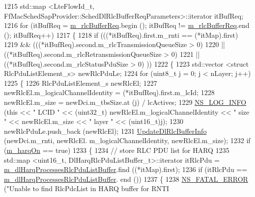 \begin{DoxyCode}
1215       std::map <LteFlowId\_t, FfMacSchedSapProvider::SchedDlRlcBufferReqParameters>::iterator itBufReq;
1216       \textcolor{keywordflow}{for} (itBufReq = \hyperlink{classns3_1_1FdBetFfMacScheduler_a77bc6d5b9a64164f6974cc8d8b0318c0}{m\_rlcBufferReq}.begin (); itBufReq != 
      \hyperlink{classns3_1_1FdBetFfMacScheduler_a77bc6d5b9a64164f6974cc8d8b0318c0}{m\_rlcBufferReq}.end (); itBufReq++)
1217         \{
1218           \textcolor{keywordflow}{if} (((*itBufReq).first.m\_rnti == (*itMap).first)
1219               && (((*itBufReq).second.m\_rlcTransmissionQueueSize > 0)
1220                   || ((*itBufReq).second.m\_rlcRetransmissionQueueSize > 0)
1221                   || ((*itBufReq).second.m\_rlcStatusPduSize > 0) ))
1222             \{
1223               std::vector <struct RlcPduListElement\_s> newRlcPduLe;
1224               \textcolor{keywordflow}{for} (uint8\_t j = 0; j < nLayer; j++)
1225                 \{
1226                   RlcPduListElement\_s newRlcEl;
1227                   newRlcEl.m\_logicalChannelIdentity = (*itBufReq).first.m\_lcId;
1228                   newRlcEl.m\_size = newDci.m\_tbsSize.at (j) / lcActives;
1229                   \hyperlink{group__logging_gafbd73ee2cf9f26b319f49086d8e860fb}{NS\_LOG\_INFO} (\textcolor{keyword}{this} << \textcolor{stringliteral}{" LCID "} << (uint32\_t) newRlcEl.m\_logicalChannelIdentity 
      << \textcolor{stringliteral}{" size "} << newRlcEl.m\_size << \textcolor{stringliteral}{" layer "} << (uint16\_t)j);
1230                   newRlcPduLe.push\_back (newRlcEl);
1231                   \hyperlink{classns3_1_1FdBetFfMacScheduler_ada0b736df057e280e0d90892015c3e86}{UpdateDlRlcBufferInfo} (newDci.m\_rnti, newRlcEl.
      m\_logicalChannelIdentity, newRlcEl.m\_size);
1232                   \textcolor{keywordflow}{if} (\hyperlink{classns3_1_1FdBetFfMacScheduler_a37792b61da166e932f6697569d19a479}{m\_harqOn} == \textcolor{keyword}{true})
1233                     \{
1234                       \textcolor{comment}{// store RLC PDU list for HARQ}
1235                       std::map <uint16\_t, DlHarqRlcPduListBuffer\_t>::iterator itRlcPdu =  
      \hyperlink{classns3_1_1FdBetFfMacScheduler_ace3cb887417444023ca2f39d5de6a7cf}{m\_dlHarqProcessesRlcPduListBuffer}.find ((*itMap).first);
1236                       \textcolor{keywordflow}{if} (itRlcPdu == \hyperlink{classns3_1_1FdBetFfMacScheduler_ace3cb887417444023ca2f39d5de6a7cf}{m\_dlHarqProcessesRlcPduListBuffer}.
      end ())
1237                         \{
1238                           \hyperlink{group__fatal_ga5131d5e3f75d7d4cbfd706ac456fdc85}{NS\_FATAL\_ERROR} (\textcolor{stringliteral}{"Unable to find RlcPdcList in HARQ buffer for RNTI 
}
\end{DoxyCode}
